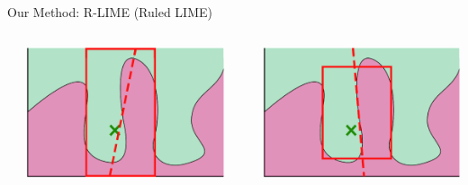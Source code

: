\documentclass[unicode]{beamer}
\begin{document}
\begin{frame}
\begin{columns}[t]
\begin{column}{\rcol\linewidth}
\begin{block}{Our Method: R-LIME (Ruled LIME)}
\begin{columns}
\begin{column}{.05\textwidth}
					\end{column}
					\begin{column}{.22\textwidth}
						\includegraphics[width=\textwidth]{src/img/visual-rlime2}
					\end{column}
					\begin{column}{.05\textwidth}
						\begin{center}
						\end{center}
					\end{column}
					\begin{column}{.22\textwidth}
						\includegraphics[width=\textwidth]{src/img/visual-rlime3}
					\end{column}
				\end{columns}

\end{block}
\end{column}
\end{columns}
\end{frame}
\end{document}
